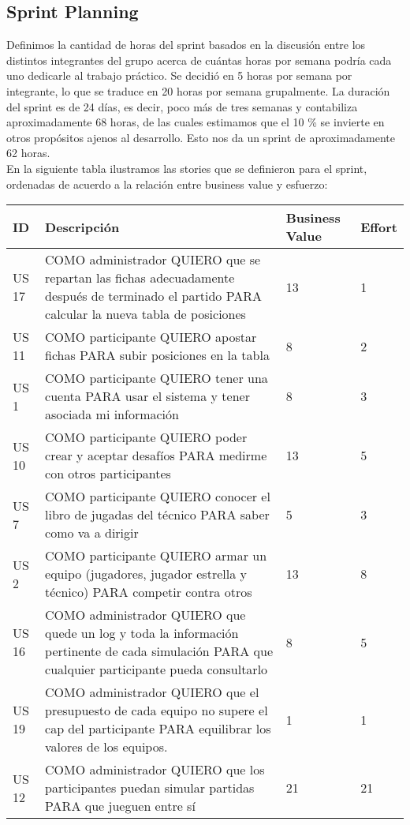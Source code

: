 \subsection{Sprint Planning}

\indent Definimos la cantidad de horas del sprint basados en la discusión entre los distintos integrantes del grupo acerca de cuántas horas por semana podría cada uno dedicarle al trabajo práctico. Se decidió en 5 horas por semana por integrante, lo que se traduce en 20 horas por semana grupalmente. La duración del sprint es de 24 días, es decir, poco más de tres semanas y contabiliza aproximadamente 68 horas, de las cuales estimamos que el 10 \% se invierte en otros propósitos ajenos al desarrollo. Esto nos da un sprint de aproximadamente 62 horas.\\

\indent En la siguiente tabla ilustramos las stories que se definieron para el sprint, ordenadas de acuerdo a la relación entre business value y esfuerzo:\\

\begin{center}
  \begin{tabular}{| l | p{10cm} | l | l | }
    \hline
ID & Descripción & Business Value & Effort\\  \hline
US 17 & COMO administrador QUIERO que se repartan las fichas adecuadamente después de terminado el partido PARA calcular la nueva tabla de posiciones & 13 & 1\\  \hline
US 11 & COMO participante QUIERO apostar fichas PARA subir posiciones en la tabla & 8 & 2\\  \hline
US 1 & COMO participante QUIERO tener una cuenta PARA usar el sistema y tener asociada mi información & 8 & 3\\  \hline
US 10 & COMO participante QUIERO poder crear y aceptar desafíos PARA medirme con otros participantes & 13 & 5\\  \hline
US 7 & COMO participante QUIERO conocer el libro de jugadas del técnico PARA saber como va a dirigir & 5 & 3\\  \hline
US 2 & COMO participante QUIERO armar un equipo (jugadores, jugador estrella y técnico) PARA competir contra otros & 13 & 8\\  \hline
US 16 & COMO administrador QUIERO que quede un log y toda la información pertinente de cada simulación PARA que cualquier participante pueda consultarlo & 8 & 5\\  \hline
US 19 & COMO administrador QUIERO que el presupuesto de cada equipo no supere el cap del participante PARA equilibrar los valores de los equipos. & 1 & 1\\  \hline
US 12 & COMO administrador QUIERO que los participantes puedan simular partidas PARA que jueguen entre sí & 21 & 21\\  \hline
  \end{tabular}
\end{center}


